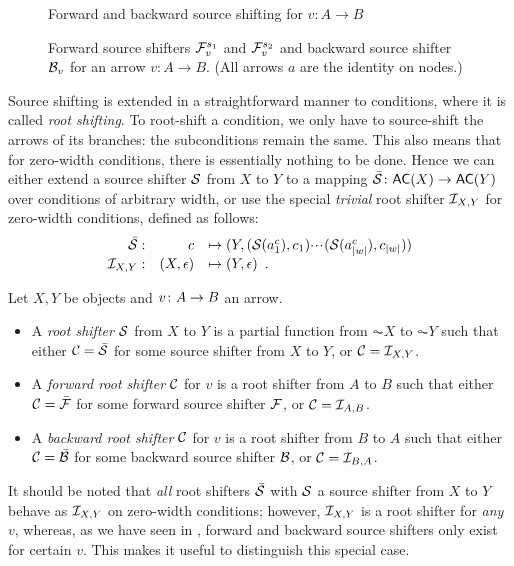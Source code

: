 \begin{figure}[t]
\centering

\caption{Forward and backward source shifting for $v:A\to B$}
\end{figure}

\begin{figure}
\centering

\caption{Forward source shifters $\mathcal{F}_v^{s_1}$ and $\mathcal{F}_v^{s_2}$ and backward source shifter $\mathcal{B}_v$ for an arrow $v:A\to B$. (All arrows $a$ are the identity on nodes.)}
\end{figure}

Source shifting is extended in a straightforward manner to conditions, where it is called \emph{root shifting}. To root-shift a condition, we only have to source-shift the arrows of its branches: the subconditions remain the same. This also means that for zero-width conditions, there is essentially nothing to be done. Hence we can either extend a source shifter $\mathcal{S}$ from $X$ to $Y$ to a mapping $\bar\cS\of \AC X\to \AC Y$ over conditions of arbitrary width, or use the special \emph{trivial} root shifter $\mathcal{I}_{X,Y}$ for zero-width conditions, defined as follows:
\[\begin{array}{rrl}
\bar{\mathcal{S}}: & c & \mapsto (Y,(\mathcal{S}(a^c_1),c_1){\cdotp\mkern-2mu\cdotp\mkern-2mu\cdotp\mkern1mu} (\mathcal{S}(a^c_{|w|}),c_{|w|})) \\
\mathcal{I}_{X,Y}: & (X,\epsilon) & \mapsto (Y,\epsilon) \enspace.
\end{array}\]

\begin{definition}
Let $X,Y$ be objects and $v\colon A\rightarrow B$ an arrow.
\begin{itemize}[topsep=\smallskipamount]
\item A \emph{root shifter} $\mathcal{S}$ from $X$ to $Y$ is a partial function from $\AC X$ to $\AC Y$ such that either $\mathcal{C}=\bar{\mathcal{S}}$ for some source shifter from $X$ to $Y$, or $\mathcal{C}=\mathcal{I}_{X,Y}$.

\item A \emph{forward root shifter} $\mathcal{C}$ for $v$ is a root shifter from $A$ to $B$ such that either $\mathcal{C}=\bar{\mathcal{F}}$ for some forward source shifter $\mathcal{F}$, or $\mathcal{C}=\mathcal{I}_{A,B}$.

\item A \emph{backward root shifter} $\mathcal{C}$ for $v$ is a root shifter from $B$ to $A$ such that either $\mathcal{C}=\bar{\mathcal{B}}$ for some backward source shifter $\mathcal{B}$, or $\mathcal{C}=\mathcal{I}_{B,A}$.
\end{itemize}
\end{definition}
%
It should be noted that \emph{all} root shifters $\bar{\mathcal{S}}$ with $\mathcal{S}$ a source shifter from $X$ to $Y$ behave as $\mathcal{I}_{X,Y}$ on zero-width conditions; however, $\mathcal{I}_{X,Y}$ is a root shifter for \emph{any} $v$, whereas, as we have seen in , forward and backward source shifters only exist for certain $v$. This makes it useful to distinguish this special case.

